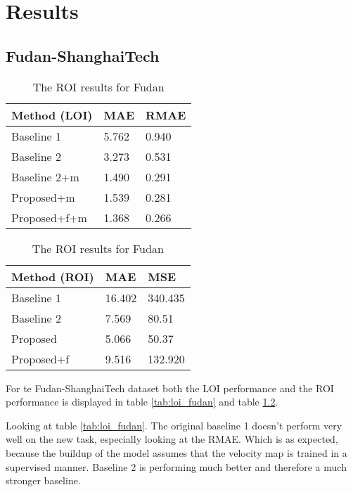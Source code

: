 \chapter{Results}

\section{Fudan-ShanghaiTech}

\begin{table}[!htb]
	\begin{minipage}{.5\linewidth}
      \centering
		\begin{tabular}{lll}
		\hline
		Method (LOI)                               & MAE & RMAE \\ \hline
		\multicolumn{1}{l|}{Baseline 1}          & 5.762 & 0.940 \\
		\multicolumn{1}{l|}{Baseline 2}          & 3.273 & 0.531 \\
		\multicolumn{1}{l|}{Baseline 2+m}      & 1.490 & 0.291 \\
		\multicolumn{1}{l|}{Proposed+m}        	 & 1.539 & 0.281 \\
		\multicolumn{1}{l|}{Proposed+f+m} & 1.368 & 0.266 \\ \hline
		\end{tabular}
		\caption{\label{tab:loi_fudan}The LOI results for Fudan}
	\end{minipage}
	\begin{minipage}{.5\linewidth}
      \centering
		\begin{tabular}{lll}
		\hline
		Method (ROI)                               & MAE & MSE \\ \hline
		\multicolumn{1}{l|}{Baseline 1}          & 16.402 & 340.435 \\
		\multicolumn{1}{l|}{Baseline 2}          & 7.569 & 80.51 \\
		\multicolumn{1}{l|}{Proposed}        	 & 5.066 & 50.37 \\
		\multicolumn{1}{l|}{Proposed+f} 		 & 9.516 & 132.920 \\ \hline
		\end{tabular}
		\caption{\label{tab:roi_fudan}The ROI results for Fudan}
	\end{minipage}
\end{table}

For te Fudan-ShanghaiTech dataset both the LOI performance and the ROI performance is displayed in table \ref{tab:loi_fudan} and table \ref{tab:roi_fudan}.

Looking at table \ref{tab:loi_fudan}. The original baseline 1 doesn't perform very well on the new task, especially looking at the RMAE. Which is as expected, because the buildup of the model assumes that the velocity map is trained in a supervised manner. Baseline 2 is performing much better and therefore a much stronger baseline.

